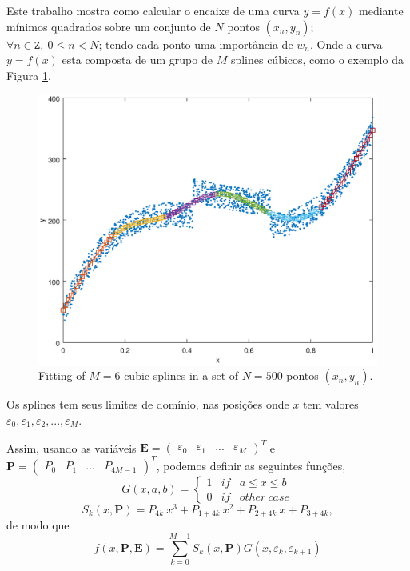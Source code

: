 \documentclass[a4paper,10pt]{article}
\begin{document}
Este trabalho mostra como calcular o encaixe de uma curva $y=f(x)$ 
mediante mínimos quadrados sobre um conjunto de $N$ pontos $(x_n,y_n)$; 
$\forall n \in \mathtt{Z},~0\leq n < N$; tendo
cada ponto uma importância de $w_n$.
Onde a curva 
$y=f(x)$ esta composta de um grupo de $M$ splines cúbicos, 
como o exemplo da Figura \ref{fig:leastmeanspline3}.
\begin{figure}[!htb]
\centering
\includegraphics[scale=0.33]{splines3demo.eps}
\caption{Fitting of $M=6$ cubic splines in a set of $N=500$ pontos $(x_n,y_n)$.}
\label{fig:leastmeanspline3}
\end{figure}

Os splines tem seus limites de domínio, nas posições onde $x$ tem valores 
$\varepsilon_{0}, \varepsilon_{1}, \varepsilon_{2}, ..., \varepsilon_{M}$. 


Assim, usando as variáveis 
$\mathbf{E}=\left(\begin{matrix}\varepsilon_0 & \varepsilon_1 & ...  & \varepsilon_{M}\end{matrix}\right)^T$ e
$\mathbf{P}=\left(\begin{matrix}P_0 & P_1 & ...  & P_{4M-1}\end{matrix}\right)^T$,
podemos definir as seguintes funções,
\begin{equation}
 G(x,a,b)= \left\{\begin{matrix}
1 & if &  a \leq x \leq b \\ 
0 & if & other~case
\end{matrix}\right.
\end{equation}
\begin{equation}
 S_k(x,\mathbf{P})=P_{4k}~x^3+P_{1+4k}~x^2+P_{2+4k}~x+P_{3+4k},
\end{equation}
de modo que
\begin{equation}
 f(x,\mathbf{P},\mathbf{E})=\sum_{k=0}^{M-1} S_k(x,\mathbf{P})G(x,\varepsilon_{k},\varepsilon_{k+1})  
\end{equation}
\end{document}
